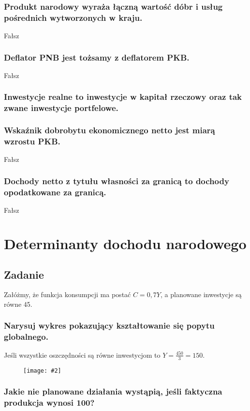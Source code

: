 \documentclass[a4paper,12pt]{article}
\newcommand{\obrazek}[2]{
	\begin{figure}[h]
		\centering
		\texttt{[image: \#2]}
	\end{figure}
}
\begin{document}
\subsubsection{Produkt narodowy wyraża łączną wartość dóbr i usług pośrednich wytworzonych w kraju.}

Fałsz

\subsubsection{Deflator PNB jest tożsamy z deflatorem PKB.}
Fałsz

\subsubsection{Inwestycje realne to inwestycje w kapitał rzeczowy oraz tak zwane inwestycje portfelowe.}

\subsubsection{Wskaźnik dobrobytu ekonomicznego netto jest miarą wzrostu PKB.}
Fałsz

\subsubsection{Dochody netto z tytułu własności za granicą to dochody opodatkowane za granicą.}
Fałsz

\section{Determinanty dochodu narodowego}

\subsection{Zadanie}

Załóżmy, że funkcja konsumpcji ma postać $C = 0,7Y$, a planowane inwestycje są równe 45.

\subsubsection{Narysuj wykres pokazujący kształtowanie się popytu globalnego.}

Jeśli wszystkie oszczędności są równe inwestycjom to $Y = \frac{450}{3} = 150$.

\obrazek{0.3}{PopytGlobalny.png}

\subsubsection{Jakie nie planowane działania wystąpią, jeśli faktyczna produkcja wynosi 100?}
\end{document}
